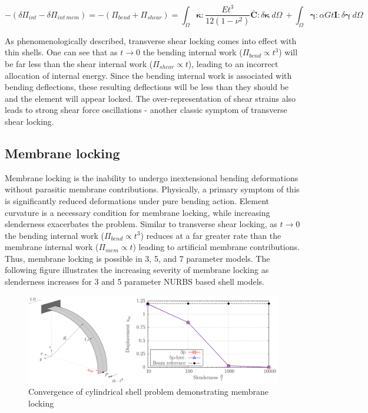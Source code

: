 \begin{equation} 
-( \delta\Pi_{int} - \delta\Pi_{int\ mem} )=
-(\Pi_{bend} + \Pi_{shear}) =
\int_\Omega
\boldsymbol{\kappa}
:
\frac{E t^3}{12(1-\nu^2)} \bar{ \mathbf{C}}
:
\delta \boldsymbol{\kappa}\ 
d \Omega\ 
+
\int_\Omega
\boldsymbol{\gamma}
:
\alpha G t \mathbf{I}
:
\delta \boldsymbol{\gamma}\ 
d \Omega
\label{eqlock2}
\end{equation}

\doublespacing

As phenomenologically described, transverse shear locking comes into effect with thin shells. One can see that as $t \rightarrow 0$ the bending internal work ($\Pi_{bend} \propto t^3$) will be far less than the shear internal work ($\Pi_{shear} \propto t$), leading to an incorrect allocation of internal energy. Since the bending internal work is associated with bending deflections, these resulting deflections will be less than they should be and the element will appear locked. The over-representation of shear strains also leads to strong shear force oscillations - another classic symptom of transverse shear locking.


\subsection{Membrane locking}

Membrane locking is the inability to undergo inextensional bending deformations without parasitic membrane contributions. Physically, a primary symptom of this is significantly reduced deformations under pure bending action. Element curvature is a necessary condition for membrane locking, while increasing slenderness exacerbates the problem. Similar to transverse shear locking, as $t \rightarrow 0$ the bending internal work ($\Pi_{bend} \propto t^3$) reduces at a far greater rate than the membrane internal work ($\Pi_{mem} \propto t$) leading to artificial membrane contributions. Thus, membrane locking is possible in 3, 5, and 7 parameter models. The following figure illustrates the increasing severity of membrane locking as slenderness increases for 3 and 5 parameter NURBS based shell models.

\begin{figure}[H]
	\centering
	\def\svgwidth{\columnwidth}
	\includegraphics[width=14cm]{images/membranelocking.png}
	\caption{Convergence of cylindrical shell problem demonstrating membrane locking \cite{Echter13}}
	\label{ansexample}
\end{figure}

